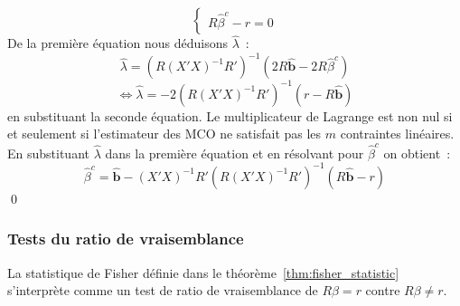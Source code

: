 \documentclass[10pt]{beamer}
\begin{document}
\begin{notes}
\[\begin{cases}
      R\hat\beta^c -r = 0
    \end{cases}
  \]
  De la première équation nous déduisons $\hat{\lambda}$~:
  \[
    \hat\lambda = \left( R(X'X)^{-1}R' \right)^{-1}\left( 2R\hat{\mathbf b} - 2R\hat{\beta}^c \right)
  \]
  \[
    \Leftrightarrow \hat{\lambda} = -2 \left( R(X'X)^{-1}R' \right)^{-1}\left( r - R\hat{\mathbf b}\right)
  \]
  en substituant la seconde équation. Le multiplicateur de Lagrange est non nul si et seulement si l'estimateur des MCO ne satisfait pas les $m$ contraintes linéaires. En substituant $\hat\lambda$ dans la première équation et en résolvant pour $\hat{\beta}^c$ on obtient~:
\[
      \hat{\beta}^c = \hat{\mathbf b} - (X'X)^{-1}R'\left( R(X'X)^{-1}R' \right)^{-1}\left( R\hat{\mathbf b}-r \right)
    \]
    \qed

\end{notes}


\begin{frame}[c]
  \frametitle{Tests du ratio de vraisemblance}

  \begin{theorem}\label{thm:likelihood_ratio_test}
    La statistique de Fisher définie dans le théorème~\ref{thm:fisher_statistic} s'interprète comme un test
    de ratio de vraisemblance de $R\beta=r$ contre $R\beta\neq r$.
  \end{theorem}

\end{frame}
\end{document}
